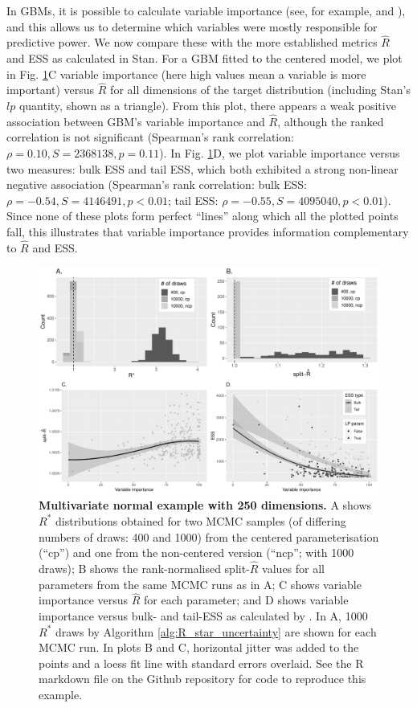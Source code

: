\documentclass{article}
\begin{document}
In GBMs, it is possible to calculate variable importance (see, for example, \cite{friedman2001greedy} and \cite{greenwell2019package}), and this allows us to determine which variables were mostly responsible for predictive power. We now compare these with the more established metrics $\widehat{R}$ and ESS as calculated in Stan. For a GBM fitted to the centered model, we plot in Fig. \ref{fig:mvt}C variable importance (here high values mean a variable is more important) versus $\widehat{R}$ for all dimensions of the target distribution (including Stan's $lp$ quantity, shown as a triangle). From this plot, there appears a weak positive association between GBM's variable importance and $\widehat{R}$, although the ranked correlation is not significant (Spearman's rank correlation: $\rho=0.10, S=2368138, p=0.11$). In Fig.  \ref{fig:mvt}D, we plot variable importance versus two measures: bulk ESS and tail ESS, which both exhibited a strong non-linear negative association (Spearman's rank correlation: bulk ESS: $\rho=-0.54, S=4146491, p<0.01$; tail ESS: $\rho=-0.55, S=4095040, p<0.01$). Since none of these plots form perfect ``lines'' along which all the plotted points fall, this illustrates that variable importance provides information complementary to $\widehat{R}$ and ESS.

\begin{figure}[!htb]
	\centerline{\includegraphics[width=1\textwidth]{../output/mvt_three.pdf}}
	\caption{\textbf{Multivariate normal example with 250 dimensions.} A shows $R^*$ distributions obtained for two MCMC samples (of differing numbers of draws: 400 and 1000) from the centered parameterisation (``cp'') and one from the non-centered version (``ncp''; with 1000 draws); B shows the rank-normalised split-$\widehat{R}$ values for all parameters from the same MCMC runs as in A; C shows variable importance versus $\widehat{R}$ for each parameter; and D shows variable importance versus bulk- and tail-ESS as calculated by \cite{vehtari2019rank}. In A, 1000 $R^*$ draws by Algorithm \ref{alg:R_star_uncertainty} are shown for each MCMC run. In plots B and C, horizontal jitter was added to the points and a loess fit line with standard errors overlaid. See the R markdown file on the Github repository for code to reproduce this example.}
	\label{fig:mvt}
\end{figure}
\end{document}
